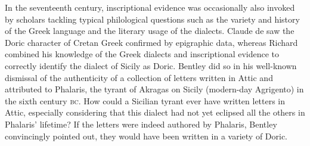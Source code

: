 \documentclass[output=paper]{langsci/langscibook}
\begin{document}
In the seventeenth century, inscriptional evidence was occasionally also invoked by scholars tackling typical philological questions such as the variety and history of the Greek language and the literary usage of the dialects. Claude de \citet[430]{Saumaise1643a} saw the Doric character of Cretan Greek confirmed by epigraphic data, whereas Richard \citet[311]{Bentley1699} combined his knowledge of the Greek dialects and inscriptional evidence to correctly identify the dialect of Sicily as Doric. Bentley did so in his well-known dismissal of the authenticity of a collection of letters written in Attic and attributed to Phalaris, the tyrant of Akragas on Sicily (modern-day Agrigento) in the sixth century \textsc{bc}. How could a Sicilian tyrant ever have written letters in Attic, especially considering that this dialect had not yet eclipsed all the others in Phalaris’ lifetime? If the letters were indeed authored by Phalaris, Bentley convincingly pointed out, they would have been written in a variety of Doric.
\end{document}
